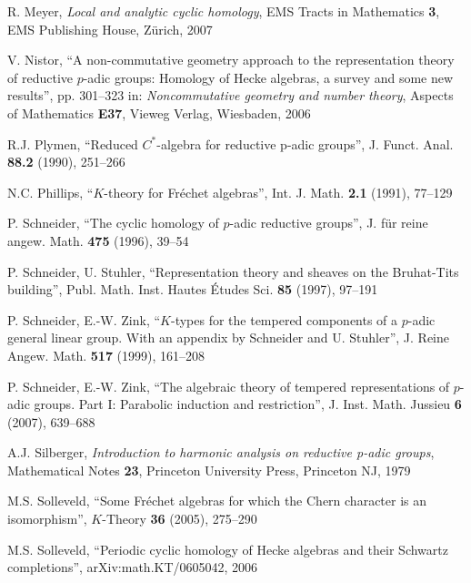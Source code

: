 \documentclass[11pt]{report}
\begin{document}
\begin{thebibliography}{99}
 R. Meyer,
\emph{Local and analytic cyclic homology},  EMS Tracts in
Mathematics \textbf{3}, EMS Publishing House, Z\"urich, 2007

 V. Nistor,
``A non-commutative geometry approach to the representation
theory of reductive $p$-adic groups: Homology of Hecke
algebras, a survey and some new results'',
pp. 301--323 in: \emph{Noncommutative geometry and number theory},
Aspects of Mathematics \textbf{E37},
Vieweg Verlag, Wiesbaden, 2006

 R.J. Plymen,
``Reduced $C^*$-algebra for reductive p-adic groups'', J. Funct.
Anal. \textbf{88.2} (1990), 251--266

 N.C. Phillips,
``$K$-theory for Fr\'echet algebras'',
Int. J. Math. \textbf{2.1} (1991), 77--129

 P. Schneider,
``The cyclic homology of $p$-adic reductive groups'',
J. f\"ur reine angew. Math. \textbf{475} (1996), 39--54

 P. Schneider, U. Stuhler,
``Representation theory and sheaves on the Bruhat-Tits building'',
Publ. Math. Inst. Hautes \'Etudes Sci. \textbf{85} (1997), 97--191

 P. Schneider, E.-W. Zink,
``$K$-types for the tempered components of a $p$-adic general linear
group. With an appendix by Schneider and U. Stuhler'', J. Reine
Angew. Math. \textbf{517} (1999), 161--208

 P. Schneider, E.-W. Zink,
``The algebraic theory of tempered representations of $p$-adic groups. 
Part I: Parabolic induction and restriction'',
J. Inst. Math. Jussieu \textbf{6} (2007), 639--688


 A.J. Silberger,
\emph{Introduction to harmonic analysis on reductive p-adic groups}, 
Mathematical Notes \textbf{23}, Princeton University
Press, Princeton NJ, 1979

 M.S. Solleveld,
``Some Fr\'echet algebras for which the Chern character
is an isomorphism'',
$K$-Theory \textbf{36} (2005), 275--290

 M.S. Solleveld,
``Periodic cyclic homology of Hecke algebras and their
Schwartz completions'',
arXiv:math.KT/0605042, 2006


\end{thebibliography}
\end{document}
